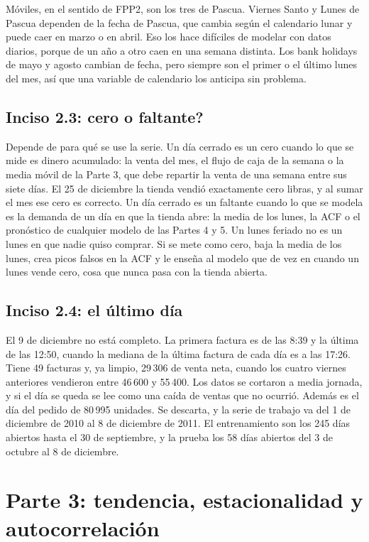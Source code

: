 \documentclass[11pt]{article}
\begin{document}
Móviles, en el sentido de FPP2, son los tres de Pascua. Viernes Santo y Lunes de Pascua
dependen de la fecha de Pascua, que cambia según el calendario lunar y puede caer en marzo o en
abril. Eso los hace difíciles de modelar con datos diarios, porque de un año a otro caen en una
semana distinta. Los bank holidays de mayo y agosto cambian de fecha, pero siempre son el primer
o el último lunes del mes, así que una variable de calendario los anticipa sin problema.

\subsection*{Inciso 2.3: \textquestiondown{}cero o faltante?}

Depende de para qué se use la serie. Un día cerrado es un cero cuando lo que se mide es
dinero acumulado: la venta del mes, el flujo de caja de la semana o la media móvil de la
Parte 3, que debe repartir la venta de una semana entre sus siete días. El 25 de diciembre la
tienda vendió exactamente cero libras, y al sumar el mes ese cero es correcto. Un día cerrado
es un faltante cuando lo que se modela es la demanda de un día en que la tienda abre: la
media de los lunes, la ACF o el pronóstico de cualquier modelo de las Partes 4 y 5. Un lunes
feriado no es un lunes en que nadie quiso comprar. Si se mete como cero, baja la media de los
lunes, crea picos falsos en la ACF y le enseña al modelo que de vez en cuando un lunes vende cero,
cosa que nunca pasa con la tienda abierta.

\subsection*{Inciso 2.4: el último día}

El 9 de diciembre no está completo. La primera factura es de las 8:39 y la última de las
12:50, cuando la mediana de la última factura de cada día es a las 17:26. Tiene 49 facturas y,
ya limpio, \textsterling{}29\,306 de venta neta, cuando los cuatro viernes anteriores vendieron entre \textsterling{}46\,600 y
\textsterling{}55\,400. Los datos se cortaron a media jornada, y si el día se queda se lee como una caída
de ventas que no ocurrió. Además es el día del pedido de 80\,995 unidades. Se descarta, y la serie
de trabajo va del 1 de diciembre de 2010 al 8 de diciembre de 2011. El entrenamiento son los 245
días abiertos hasta el 30 de septiembre, y la prueba los 58 días abiertos del 3 de octubre al 8
de diciembre.

\section*{Parte 3: tendencia, estacionalidad y autocorrelación}
\end{document}
